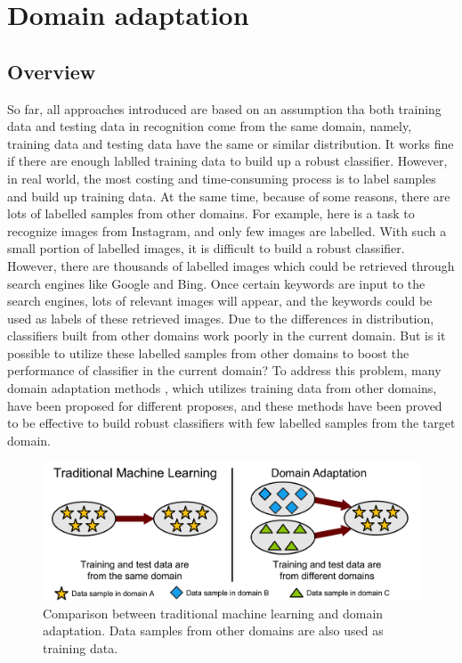 \section{Domain adaptation}
\subsection{Overview}
So far, all approaches introduced are based on an assumption tha both training data and testing data in recognition come from the same domain, namely, training data and testing data have the same or similar distribution. It works fine if there are enough lablled training data to build up a robust classifier. However, in real world, the most costing and time-consuming process is to label samples and build up training data. At the same time, because of some reasons, there are lots of labelled samples from other domains. For example, here is a task to recognize images from Instagram, and only few images are labelled. With such a small portion of labelled images, it is difficult to build a robust classifier. However, there are thousands of labelled images which could be retrieved through search engines like Google and Bing. Once certain keywords are input to the search engines, lots of relevant images will appear, and the keywords could be used as labels of these retrieved images. Due to the differences in distribution, classifiers built from other domains work poorly in the current domain. But is it possible to utilize these labelled samples from other domains to boost the performance of classifier in the current domain? To address this problem, many domain adaptation methods \cite{daume2007frustratingly, yang2007cross, duan2009domain, duan2012visual}, which utilizes training data from other domains, have been proposed for different proposes, and these methods have been proved to be effective to build robust classifiers with few labelled samples from the target domain. \\


\begin{figure}[!ht]
\centering
  \includegraphics[width=1\textwidth]{./domainAdaption.png}
\caption{Comparison between traditional machine learning and domain adaptation. Data samples from other domains are also used as training data.}
\end{figure}

